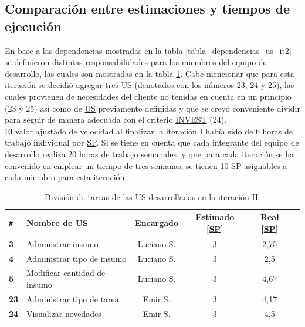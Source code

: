\documentclass[a4paper, 12pt,twoside]{report}  %
\numberwithin{equation}{subsection} %
\begin{document}
\subsection{Comparación entre estimaciones y tiempos de ejecución}
En base a las dependencias mostradas en la tabla \ref{tabla_dependencias_us_it2} se definieron distintas responsabilidades para los miembros del equipo de desarrollo, las cuales son mostradas en la tabla \ref{tabla_desarrollo_iter_2}. Cabe mencionar que para esta iteración se decidió agregar tres \hyperlink{US}{US} (denotados con los números 23, 24 y 25), las cuales provienen de necesidades del cliente no tenidas en cuenta en un principio (23 y 25) así como de \hyperlink{US}{US} previamente definidas y que se creyó conveniente dividir para seguir de manera adecuada con el criterio \hyperlink{INVEST}{INVEST} (24).\\
\indent El valor ajustado de velocidad al finalizar la iteración I había sido de 6 horas de trabajo individual por \hyperlink{SP}{SP}. Si se tiene en cuenta que cada integrante del equipo de desarrollo realiza 20 horas de trabajo semanales, y que para cada iteración se ha convenido en emplear un tiempo de tres semanas, se tienen 10 \hyperlink{SP}{SP} asignables a cada miembro para esta iteración.

\begin{table}[h!]
	\centering
	\begin{tabular}{ |p{0.5cm}|p{6cm}|c|c|c|c| }
		\hline
		\verb|#|& \textbf{Nombre de \hyperlink{US}{US}}& \textbf{Encargado} & \textbf{Estimado [\hyperlink{SP}{SP}]} & \textbf{Real [\hyperlink{SP}{SP}]} \\
		\hline
		\textbf{3} & Administrar insumo & \cellcolor{marca_US_luciano}Luciano S. & 3 & 2,75 \\
		\hline
		\textbf{4} & Administrar tipo de insumo & \cellcolor{marca_US_luciano}Luciano S. & 3 & 2,5 \\
		\hline
		\textbf{5} & Modificar cantidad de insumo & \cellcolor{marca_US_luciano}Luciano S. & 3 & 4,67\\
		\hline
		\textbf{23} & Administrar tipo de tarea & \cellcolor{marca_US_emir}Emir S. & 3 & 4,17 \\
		\hline
		\textbf{24} & Visualizar novedades & \cellcolor{marca_US_emir}Emir S. & 3 & 4,5 \\
		\hline
	\end{tabular}
	\caption{División de tareas de las \protect\hyperlink{US}{US} desarrolladas en la iteración II.}
	\label{tabla_desarrollo_iter_2}
\end{table}
\end{document}
